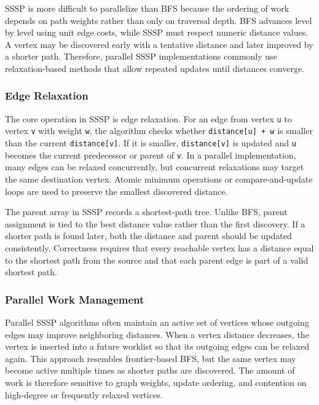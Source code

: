 \documentclass{article}
\begin{document}
SSSP is more difficult to parallelize than BFS because the ordering of work depends on path weights rather than only on traversal depth. BFS advances level by level using unit edge costs, while SSSP must respect numeric distance values. A vertex may be discovered early with a tentative distance and later improved by a shorter path. Therefore, parallel SSSP implementations commonly use relaxation-based methods that allow repeated updates until distances converge.

\subsubsection*{Edge Relaxation}

The core operation in SSSP is edge relaxation. For an edge from vertex \texttt{u} to vertex \texttt{v} with weight \texttt{w}, the algorithm checks whether \texttt{distance[u] + w} is smaller than the current \texttt{distance[v]}. If it is smaller, \texttt{distance[v]} is updated and \texttt{u} becomes the current predecessor or parent of \texttt{v}. In a parallel implementation, many edges can be relaxed concurrently, but concurrent relaxations may target the same destination vertex. Atomic minimum operations or compare-and-update loops are used to preserve the smallest discovered distance.

The parent array in SSSP records a shortest-path tree. Unlike BFS, parent assignment is tied to the best distance value rather than the first discovery. If a shorter path is found later, both the distance and parent should be updated consistently. Correctness requires that every reachable vertex has a distance equal to the shortest path from the source and that each parent edge is part of a valid shortest path.

\subsubsection*{Parallel Work Management}

Parallel SSSP algorithms often maintain an active set of vertices whose outgoing edges may improve neighboring distances. When a vertex distance decreases, the vertex is inserted into a future worklist so that its outgoing edges can be relaxed again. This approach resembles frontier-based BFS, but the same vertex may become active multiple times as shorter paths are discovered. The amount of work is therefore sensitive to graph weights, update ordering, and contention on high-degree or frequently relaxed vertices.
\end{document}
